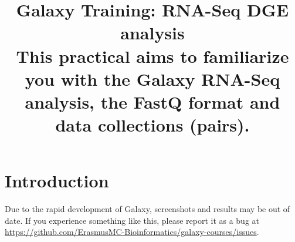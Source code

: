 \documentclass[11pt,a4paper]{article}
\begin{document}
\title{ \textit{\institute}\text{ }Galaxy Training: RNA-Seq DGE analysis \\
{ \large This practical aims to familiarize you with the Galaxy RNA-Seq analysis, the FastQ format and data collections (pairs).}}

\author{ \authors }
\maketitle



\section*{Introduction}
Due to the rapid development of Galaxy, screenshots and results may be out of date. If you experience something like this, please report it as a bug at \url{https://github.com/ErasmusMC-Bioinformatics/galaxy-courses/issues}.




\end{document}
